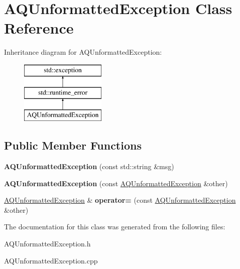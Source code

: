 \hypertarget{class_a_q_unformatted_exception}{}\section{A\+Q\+Unformatted\+Exception Class Reference}
\label{class_a_q_unformatted_exception}
Inheritance diagram for A\+Q\+Unformatted\+Exception\+:\begin{figure}[H]
\begin{center}
\leavevmode
\includegraphics[height=3.000000cm]{class_a_q_unformatted_exception}
\end{center}
\end{figure}
\subsection*{Public Member Functions}
\begin{DoxyCompactItemize}
\item 
{\bfseries A\+Q\+Unformatted\+Exception} (const std\+::string \&msg)\hypertarget{class_a_q_unformatted_exception_a61ea812823c79cde5c1ce12624af453e}{}\label{class_a_q_unformatted_exception_a61ea812823c79cde5c1ce12624af453e}

\item 
{\bfseries A\+Q\+Unformatted\+Exception} (const \hyperlink{class_a_q_unformatted_exception}{A\+Q\+Unformatted\+Exception} \&other)\hypertarget{class_a_q_unformatted_exception_a80cac0b2a15cf523c52955198cebf463}{}\label{class_a_q_unformatted_exception_a80cac0b2a15cf523c52955198cebf463}

\item 
\hyperlink{class_a_q_unformatted_exception}{A\+Q\+Unformatted\+Exception} \& {\bfseries operator=} (const \hyperlink{class_a_q_unformatted_exception}{A\+Q\+Unformatted\+Exception} \&other)\hypertarget{class_a_q_unformatted_exception_ae68d1b7ff69dd77f0952598269129912}{}\label{class_a_q_unformatted_exception_ae68d1b7ff69dd77f0952598269129912}

\end{DoxyCompactItemize}


The documentation for this class was generated from the following files\+:\begin{DoxyCompactItemize}
\item 
A\+Q\+Unformatted\+Exception.\+h\item 
A\+Q\+Unformatted\+Exception.\+cpp\end{DoxyCompactItemize}
